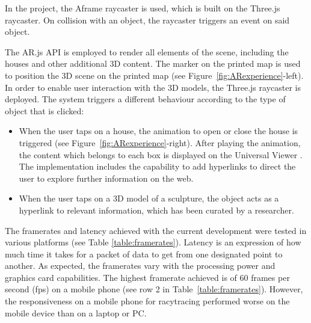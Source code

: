 \documentclass[acmlarge,screen,dvipsnames]{acmart}
\begin{document}
In the project, the Aframe raycaster is used, which is built
on the Three.js raycaster. On collision with an object, the raycaster triggers
an event on said object. 

The AR.js API is employed to render all elements of the scene, including the
houses and other additional 3D content. The marker on the printed map is used
to position the 3D scene on the printed map (see
Figure~\ref{fig:ARexperience}-left). In order to enable user interaction with
the 3D models, the Three.js raycaster is deployed. The system triggers a different
behaviour according to the type of object that is clicked: 

\begin{itemize}
\item When the user taps on a house, the animation to open or close the house
is triggered (see Figure~\ref{fig:ARexperience}-right). After playing the
animation, the content which belongs to each box is displayed on the Universal
Viewer \cite{uv}. The implementation includes the capability to add hyperlinks
to direct the user to explore further information on the web. 
\item When the
user taps on a 3D model of a sculpture, the object acts as a hyperlink to
relevant information, which has been curated by a researcher.  
\end{itemize}


The framerates and latency achieved with the current development were tested
in various platforms (see Table \ref{table:framerates}). Latency is an
expression of how much time it takes for a packet of data to get from one
designated point to another. As expected, the framerates vary with the
processing power and graphics card capabilities. The highest framerate
achieved is of 60 frames per second (fps) on a mobile phone (see row 2 in
Table~\ref{table:framerates}). However, the responsiveness on a mobile phone for
racytracing performed worse on the mobile device than on a laptop or PC.
\end{document}
